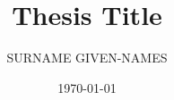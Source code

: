 \documentclass[ieeebib]{CCDSthesis} %
\title{Thesis Title}
\author{SURNAME GIVEN-NAMES}
\affiliation{College of Computing and Data Science}
\date{\titledate\today}
\begin{document}
    

    \cleardoublepage


    \ifdefined\isdraft
        \doublespacing
    \else
        \onehalfspacing
    \fi

    
    
    
    



    \begin{appendices}

        
        

    \end{appendices}
\end{document}
